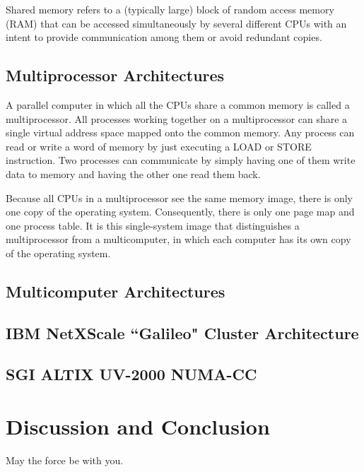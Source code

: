 \documentclass[a4paper,12pt]{article}
\begin{document}
Shared memory refers to a (typically large) block of random access memory (RAM) that can be accessed simultaneously by several different CPUs with an intent to provide communication among them or avoid redundant copies.


\subsection{Multiprocessor Architectures}
A parallel computer in which all the CPUs share a common memory is called a multiprocessor. 
All processes working together on a multiprocessor can share a single virtual address space mapped onto the common memory. 
Any process can read or write a word of memory by just executing a LOAD or STORE instruction.
Two processes can communicate by simply having one of them write data to memory and having the other one read them back.

Because all CPUs in a multiprocessor see the same memory image, there is only one copy of the operating system. 
Consequently, there is only one page map and one process table. 
It is this single-system image that distinguishes a multiprocessor from a multicomputer, in which each computer has its own copy of the operating system.


\subsection{Multicomputer Architectures}

\subsection{IBM NetXScale ``Galileo" Cluster Architecture}\label{galileoarch:sec}
\subsection{SGI ALTIX UV-2000 NUMA-CC}\label{numaarch:sec}


\section{Discussion and Conclusion}

May the force be with you.

\end{document}

